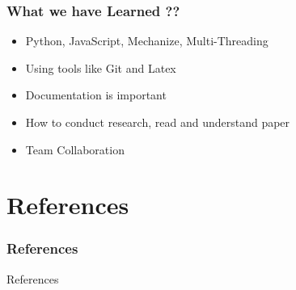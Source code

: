 \documentclass[12pt,xcolor=dvipsnames]{beamer}
\begin{document}
\begin{frame}
\frametitle{What we have Learned ??}
\begin{itemize}
	\item Python, JavaScript, Mechanize, Multi-Threading
    \item Using tools like Git and Latex
    \item Documentation is important
    \item How to conduct research, read and understand paper
    \item Team Collaboration
\end{itemize}
\end{frame}

\section{References}
\frametitle{References}
\begin{frame}[allowframebreaks]{References}


\end{frame}
\end{document}
